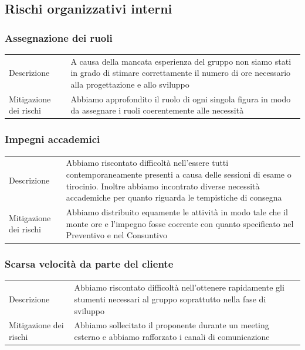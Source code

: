 \documentclass{article}
\begin{document}
\subsection{Rischi organizzativi interni}

\subsubsection{Assegnazione dei ruoli}
\begin{center}
\begin{tabular}{P{10em} P{20em}} 
     Descrizione &  A causa della mancata esperienza del gruppo non siamo stati in grado di stimare correttamente il numero di ore necessario alla progettazione e allo sviluppo\\ 
    Mitigazione dei rischi &  Abbiamo approfondito il ruolo di ogni singola figura in modo da assegnare i ruoli coerentemente alle necessità\\
\end{tabular}
\end{center}

\subsubsection{Impegni accademici}
\begin{center}
\begin{tabular}{P{10em} P{20em}} 
     Descrizione & Abbiamo riscontato difficoltà nell'essere tutti contemporaneamente presenti a causa delle sessioni di esame o tirocinio. Inoltre abbiamo incontrato diverse necessità accademiche per quanto riguarda le tempistiche di consegna \\ 
    Mitigazione dei rischi & Abbiamo distribuito equamente le attività in modo tale che il monte ore e l'impegno fosse coerente con quanto specificato nel Preventivo e nel Consuntivo  \\
\end{tabular}
\end{center}

\subsubsection{Scarsa velocità da parte del cliente}
\begin{center}
\begin{tabular}{P{10em} P{20em}} 
     Descrizione & Abbiamo riscontato difficoltà nell'ottenere rapidamente gli stumenti necessari al gruppo soprattutto nella fase di sviluppo \\ 
    Mitigazione dei rischi & Abbiamo sollecitato il proponente durante un meeting esterno e abbiamo rafforzato i canali di comunicazione \\
\end{tabular}
\end{center}
\end{document}
